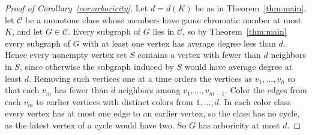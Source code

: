 \documentclass[11pt]{article}
\theoremstyle{remark}
\begin{document}
\begin{proof}[Proof of Corollary~\ref{cor:arboricity}]
Let $d=d(K)$ be as in Theorem~\ref{thm:main}, let $\mathcal C$ be a
monotone class whose members have game chromatic number at most $K$, and
let $G\in\mathcal C$. Every subgraph of $G$ lies in $\mathcal C$, so by
Theorem~\ref{thm:main} every subgraph of $G$ with at least one vertex has
average degree less than $d$. Hence every nonempty vertex set $S$ contains
a vertex with fewer than $d$ neighbors in $S$, since otherwise the subgraph
induced by $S$ would have average degree at least $d$. Removing such
vertices one at a time orders the vertices as $v_1,\dots,v_n$ so that each
$v_m$ has fewer than $d$ neighbors among $v_1,\dots,v_{m-1}$. Color the
edges from each $v_m$ to earlier vertices with distinct colors from
$1,\dots,d$. In each color class every vertex has at most one edge to an
earlier vertex, so the class has no cycle, as the latest vertex of a cycle
would have two. So $G$ has arboricity at most $d$.
\end{proof}
\end{document}
